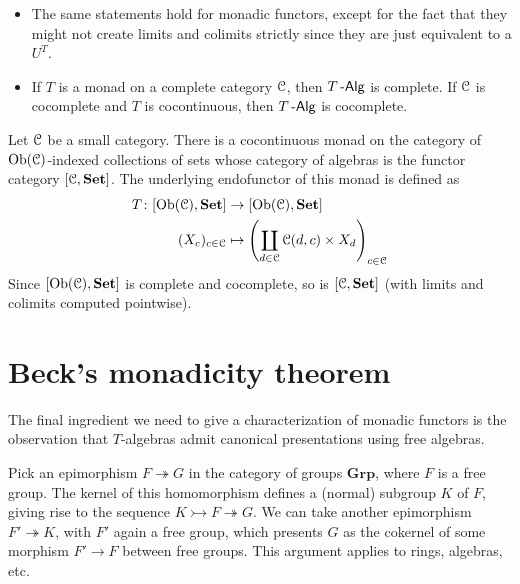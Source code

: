 \documentclass[a4paper,11pt,oneside,openany]{scrbook}
\begin{document}
\begin{rmk}
    \begin{itemize}
        \item The same statements hold for monadic functors, except for the fact that they might not create limits and colimits strictly since they are just equivalent to a $U^T$.
        \item If $T$ is a monad on a complete category $\operatorname{\mathcal{C}}$, then $T\operatorname{-\mathsf{Alg}}$ is complete. If $\operatorname{\mathcal{C}}$ is cocomplete and $T$ is cocontinuous, then $T\operatorname{-\mathsf{Alg}}$ is cocomplete.
    \end{itemize}
\end{rmk}

\begin{exmp}
	Let $\operatorname{\mathcal{C}}$ be a small category. There is a cocontinuous monad on the category of $\operatorname{Ob}(\operatorname{\mathcal{C}})$-indexed collections of sets whose category of algebras is the functor category $[\operatorname{\mathcal{C}},{\normalfont\textbf{Set}}]$. The underlying endofunctor of this monad is defined as
	\begin{align*}
		T\colon[\operatorname{Ob}(\operatorname{\mathcal{C}}),{\normalfont\textbf{Set}}] & \to[\operatorname{Ob}(\operatorname{\mathcal{C}}),{\normalfont\textbf{Set}}]                                               \\
		(X_c)_{c\in\operatorname{\mathcal{C}}}        & \mapsto \left(\coprod_{d\in\operatorname{\mathcal{C}}}\operatorname{\mathcal{C}}(d,c)\times X_d\right)_{c\in\operatorname{\mathcal{C}}}
	\end{align*}
	Since $[\operatorname{Ob}(\operatorname{\mathcal{C}}),{\normalfont\textbf{Set}}]$ is complete and cocomplete, so is $[\operatorname{\mathcal{C}},{\normalfont\textbf{Set}}]$ (with limits and colimits computed pointwise).
\end{exmp}

\section{Beck’s monadicity theorem}

The final ingredient we need to give a characterization of monadic functors is the observation that $T$-algebras admit canonical presentations using free algebras.

\begin{exmp}
	Pick an epimorphism $F\twoheadrightarrow G$ in the category of groups $\mathbf{Grp}$, where $F$ is a free group. The kernel of this homomorphism defines a (normal) subgroup $K$ of $F$, giving rise to the sequence $K\rightarrowtail F\twoheadrightarrow G$. We can take another epimorphism $F'\twoheadrightarrow K$, with $F'$ again a free group, which presents $G$ as the cokernel of some morphism $F'\to F$ between free groups. This argument applies to rings, algebras, etc.
\end{exmp}
\end{document}
